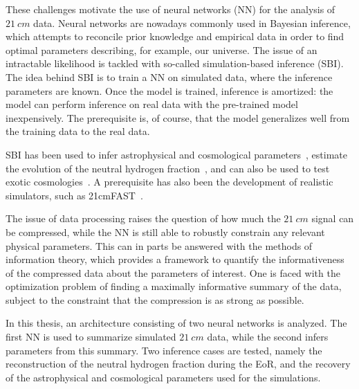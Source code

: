 These challenges motivate the use of neural networks (NN) for the analysis of $21~\si{cm}$ data. Neural networks are nowadays commonly used in Bayesian inference, which attempts to reconcile prior knowledge and empirical data in order to find optimal parameters describing, for example, our universe. The issue of an intractable likelihood is tackled with so-called simulation-based inference (SBI). The idea behind SBI is to train a NN on simulated data, where the inference parameters are known. Once the model is trained, inference is amortized: the model can perform inference on real data with the pre-trained model inexpensively. The prerequisite is, of course, that the model generalizes well from the training data to the real data.

SBI has been used to infer astrophysical and cosmological parameters~\cite{heneka_2022}, estimate the evolution of the neutral hydrogen fraction~\cite{Pietschke_2025}, and can also be used to test exotic cosmologies~\cite{Schosser_2026}. A prerequisite has also been the development of realistic simulators, such as 21cmFAST~\cite{Mesinger_2010}.

The issue of data processing raises the question of how much the $21~\si{cm}$ signal can be compressed, while the NN is still able to robustly constrain any relevant physical parameters. This can in parts be answered with the methods of information theory, which provides a framework to quantify the informativeness of the compressed data about the parameters of interest. One is faced with the optimization problem of finding a maximally informative summary of the data, subject to the constraint that the compression is as strong as possible. 

In this thesis, an architecture consisting of two neural networks is analyzed. The first NN is used to summarize simulated $21~\si{cm}$ data, while the second infers parameters from this summary. Two inference cases are tested, namely the reconstruction of the neutral hydrogen fraction during the EoR, and the recovery of the astrophysical and cosmological parameters used for the simulations.